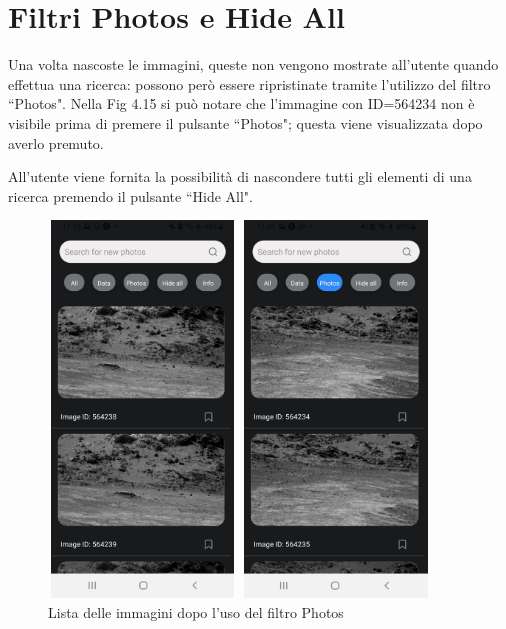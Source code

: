 \section{Filtri Photos e Hide All}
Una volta nascoste le immagini, queste non vengono mostrate all'utente quando effettua una ricerca: possono per\`o essere ripristinate tramite l'utilizzo del filtro ``Photos".
Nella Fig 4.15 si pu\`o notare che l'immagine con ID=564234 non \`e visibile prima di premere il pulsante ``Photos"; questa viene visualizzata dopo averlo premuto.

All'utente viene fornita la possibilit\`a di nascondere tutti gli elementi di una ricerca premendo il pulsante ``Hide All".
\begin{figure}[h]
    \begin{minipage}[h]{0.47\textwidth}
        \centering
        \includegraphics[width=5cm, height=10cm]{images/immaginiAndroid/prePhotos.jpg}
        \caption{\label{prePhotosAndroid} Lista delle immagini prima di usare il filtro Photos}
    \end{minipage}
    \hfill
    \begin{minipage}[h]{0.47\textwidth}
        \centering
        \includegraphics[width=5cm, height=10cm]{images/immaginiAndroid/postPhotos.jpg}
        \caption{\label{postPhotosAndroid} Lista delle immagini dopo l'uso del filtro Photos}
    \end{minipage}
\end{figure}
